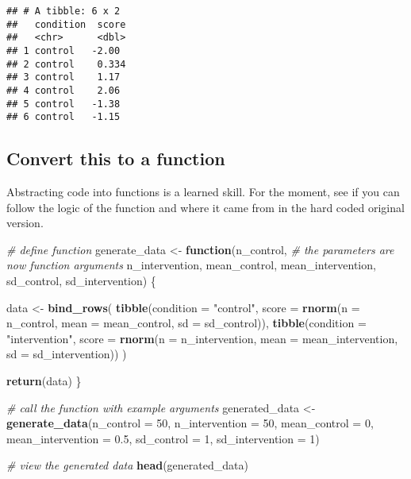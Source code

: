 \documentclass[
]{article}
\newenvironment{Shaded}{\begin{snugshade}}{\end{snugshade}}
\newcommand{\AttributeTok}[1]{\textcolor[rgb]{0.13,0.29,0.53}{#1}}
\newcommand{\CommentTok}[1]{\textcolor[rgb]{0.56,0.35,0.01}{\textit{#1}}}
\newcommand{\ControlFlowTok}[1]{\textcolor[rgb]{0.13,0.29,0.53}{\textbf{#1}}}
\newcommand{\DecValTok}[1]{\textcolor[rgb]{0.00,0.00,0.81}{#1}}
\newcommand{\FloatTok}[1]{\textcolor[rgb]{0.00,0.00,0.81}{#1}}
\newcommand{\FunctionTok}[1]{\textcolor[rgb]{0.13,0.29,0.53}{\textbf{#1}}}
\newcommand{\NormalTok}[1]{#1}
\newcommand{\OtherTok}[1]{\textcolor[rgb]{0.56,0.35,0.01}{#1}}
\newcommand{\StringTok}[1]{\textcolor[rgb]{0.31,0.60,0.02}{#1}}
\begin{document}
\begin{verbatim}
## # A tibble: 6 x 2
##   condition  score
##   <chr>      <dbl>
## 1 control   -2.00 
## 2 control    0.334
## 3 control    1.17 
## 4 control    2.06 
## 5 control   -1.38 
## 6 control   -1.15
\end{verbatim}

\hypertarget{convert-this-to-a-function}{%
\subsection{Convert this to a
function}\label{convert-this-to-a-function}}

Abstracting code into functions is a learned skill. For the moment, see
if you can follow the logic of the function and where it came from in
the hard coded original version.

\begin{Shaded}
\begin{Highlighting}[]
\CommentTok{\# define function}
\NormalTok{generate\_data }\OtherTok{\textless{}{-}} \ControlFlowTok{function}\NormalTok{(n\_control, }\CommentTok{\# the parameters are now function arguments}
\NormalTok{                          n\_intervention,}
\NormalTok{                          mean\_control,}
\NormalTok{                          mean\_intervention,}
\NormalTok{                          sd\_control,}
\NormalTok{                          sd\_intervention) \{}
  
\NormalTok{  data }\OtherTok{\textless{}{-}} 
    \FunctionTok{bind\_rows}\NormalTok{(}
      \FunctionTok{tibble}\NormalTok{(}\AttributeTok{condition =} \StringTok{"control"}\NormalTok{,}
             \AttributeTok{score =} \FunctionTok{rnorm}\NormalTok{(}\AttributeTok{n =}\NormalTok{ n\_control, }\AttributeTok{mean =}\NormalTok{ mean\_control, }\AttributeTok{sd =}\NormalTok{ sd\_control)),}
      \FunctionTok{tibble}\NormalTok{(}\AttributeTok{condition =} \StringTok{"intervention"}\NormalTok{,}
             \AttributeTok{score =} \FunctionTok{rnorm}\NormalTok{(}\AttributeTok{n =}\NormalTok{ n\_intervention, }\AttributeTok{mean =}\NormalTok{ mean\_intervention, }\AttributeTok{sd =}\NormalTok{ sd\_intervention))}
\NormalTok{    ) }
  
  \FunctionTok{return}\NormalTok{(data)}
\NormalTok{\}}

\CommentTok{\# call the function with example arguments}
\NormalTok{generated\_data }\OtherTok{\textless{}{-}} \FunctionTok{generate\_data}\NormalTok{(}\AttributeTok{n\_control =} \DecValTok{50}\NormalTok{,}
                                \AttributeTok{n\_intervention =} \DecValTok{50}\NormalTok{,}
                                \AttributeTok{mean\_control =} \DecValTok{0}\NormalTok{,}
                                \AttributeTok{mean\_intervention =} \FloatTok{0.5}\NormalTok{,}
                                \AttributeTok{sd\_control =} \DecValTok{1}\NormalTok{,}
                                \AttributeTok{sd\_intervention =} \DecValTok{1}\NormalTok{)}

\CommentTok{\# view the generated data}
\FunctionTok{head}\NormalTok{(generated\_data)}
\end{Highlighting}
\end{Shaded}
\end{document}
